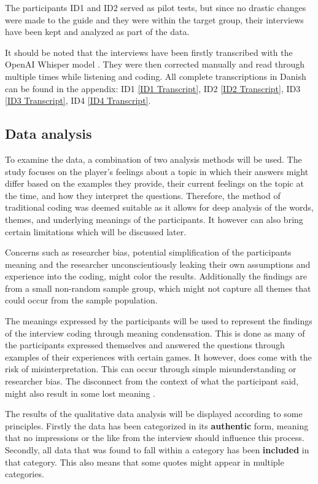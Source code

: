 The participants ID1 and ID2 served as pilot tests, but since no drastic changes were made to the guide and they were within the target group, their interviews have been kept and analyzed as part of the data.

It should be noted that the interviews have been firstly transcribed with the OpenAI Whisper model \cite{noauthor_openai_nodate}. They were then corrected manually and read through multiple times while listening and coding. All complete transcriptions in Danish can be found in the appendix: ID1  \ref{ID1 Transcript}, ID2 \ref{ID2 Transcript}, ID3 \ref{ID3 Transcript}, ID4 \ref{ID4 Transcript}.

\subsection{Data analysis}
To examine the data, a combination of two analysis methods will be used. The study focuses on the player's feelings about a topic in which their answers might differ based on the examples they provide, their current feelings on the topic at the time, and how they interpret the questions. Therefore, the method of traditional coding was deemed suitable as it allows for deep analysis of the words, themes, and underlying meanings of the participants. It however can also bring certain limitations which will be discussed later.

Concerns such as researcher bias, potential simplification of the participants meaning and the researcher unconscientiously leaking their own assumptions and experience into the coding, might color the results. Additionally the findings are from a small non-random sample group, which might not capture all themes that could occur from the sample population.

The meanings expressed by the participants will be used to represent the findings of the interview coding through meaning condensation. This is done as many of the participants expressed themselves and answered the questions through examples of their experiences with certain games. It however, does come with the risk of misinterpretation. This can occur through simple misunderstanding or researcher bias. The disconnect from the context of what the participant said, might also result in some lost meaning \cite{thomas_bjorner_qualitative_2015}. 

The results of the qualitative data analysis will be displayed according to some principles. Firstly the data has been categorized in its \textbf{authentic} form, meaning that no impressions or the like from the interview should influence this process. Secondly, all data that was found to fall within a category has been \textbf{included} in that category. This also means that some quotes might appear in multiple categories. 

